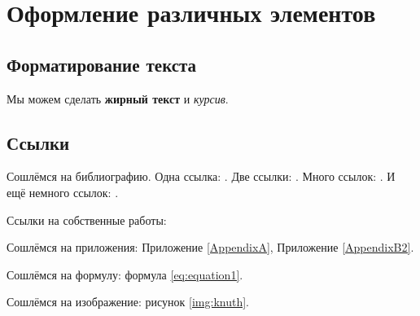 \chapter{Оформление различных элементов} \label{chapt1}

\section{Форматирование текста} \label{sect1_1}

Мы можем сделать \textbf{жирный текст} и \textit{курсив}.


\section{Ссылки} \label{sect1_2}
Сошлёмся на библиографию.
Одна ссылка: \cite[с.~54]{Sokolov}\cite[с.~36]{Gaidaenko}.
Две ссылки: \cite{Sokolov,Gaidaenko}.
Много ссылок: %
\cite{Lermontov,Management,Borozda,Marketing,Constitution,FamilyCode,Gost.7.0.53,Razumovski,Lagkueva,Pokrovski,Sirotko,Lukina,Methodology,Encyclopedia,Nasirova,Berestova,Kriger}.
И ещё немного ссылок:
\cite{Article,Book,Booklet,Conference,Inbook,Incollection,Manual,Mastersthesis,Misc,Phdthesis,Proceedings,Techreport,Unpublished}.
\cite{medvedev2006jelektronnye, CEAT:CEAT581, doi:10.1080/01932691.2010.513279,Gosele1999161,Li2007StressAnalysis, Shoji199895,test:eisner-sample,AB_patent_Pomerantz_1968,iofis_patent1960}



Ссылки на собственные работы:~\cite{vakbib1, confbib1}

Сошлёмся на приложения: Приложение \ref{AppendixA}, Приложение \ref{AppendixB2}.

Сошлёмся на формулу: формула \eqref{eq:equation1}.

Сошлёмся на изображение: рисунок \ref{img:knuth}.

